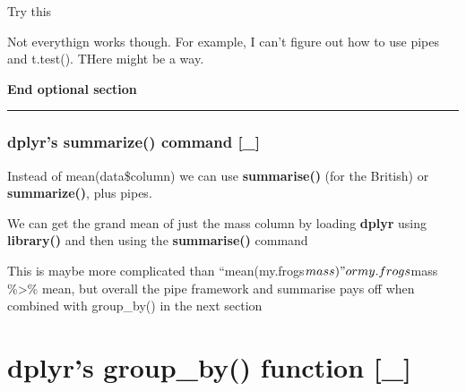 \documentclass[]{book}
\newenvironment{Shaded}{\begin{snugshade}}{\end{snugshade}}
\newcommand{\KeywordTok}[1]{\textcolor[rgb]{0.13,0.29,0.53}{\textbf{#1}}}
\newcommand{\StringTok}[1]{\textcolor[rgb]{0.31,0.60,0.02}{#1}}
\newcommand{\CommentTok}[1]{\textcolor[rgb]{0.56,0.35,0.01}{\textit{#1}}}
\newcommand{\OperatorTok}[1]{\textcolor[rgb]{0.81,0.36,0.00}{\textbf{#1}}}
\newcommand{\NormalTok}[1]{#1}
\theoremstyle{definition}
\theoremstyle{definition}
\theoremstyle{definition}
\theoremstyle{remark}
\begin{document}
Try this

\begin{Shaded}
\end{Shaded}

Not everythign works though. For example, I can't figure out how to use
pipes and t.test(). THere might be a way.

\begin{Shaded}
\end{Shaded}

\textbf{End optional section}

\begin{center}\rule{0.5\linewidth}{\linethickness}\end{center}

\subsubsection{dplyr's summarize() command
{[}\_{]}}\label{dplyrs-summarize-command-_}

Instead of mean(data\$column) we can use \textbf{summarise()} (for the
British) or \textbf{summarize()}, plus pipes.

We can get the grand mean of just the mass column by loading
\textbf{dplyr} using \textbf{library()} and then using the
\textbf{summarise()} command

\begin{Shaded}
\end{Shaded}

This is maybe more complicated than
``mean(my.frogs\(mass)" or my.frogs\)mass \%\textgreater{}\% mean, but
overall the pipe framework and summarise pays off when combined with
group\_by() in the next section

\section{dplyr's group\_by() function
{[}\_{]}}\label{dplyrs-group_by-function-_}
\end{document}

